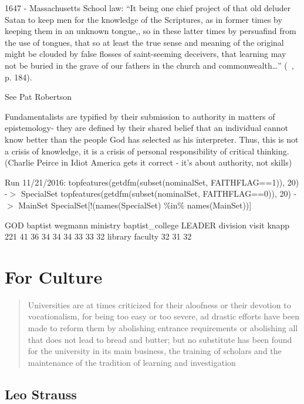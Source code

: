 1647 - Massachusetts School law:
``It being one chief project of that old deluder Satan to keep men for the knowledge of the Scriptures, as in former times by keeping them in an unknown tongue,, so in these latter times by persuafind from the use of tongues, that so at least the true sense and meaning of the original might be clouded by false flosses of saint-seeming deceivers, that learning may not be buried in the grave of our fathers in the church and commonwealth{\ldots}'' (~\citep{Adler:1976tx}, p. 184).

See Pat Robertson

Fundamentalists are typified by their submission to authority in matters of epistemology- they are defined by their shared belief that an individual cannot know better than the people God has selected as his interpreter. Thus, this is not a crisis of knowledge, it is a crisis of personal responsibility of critical thinking. (Charlie Peirce in Idiot America gets it correct - it's about authority, not skills)

Run 11\slash 21\slash 2016:
topfeatures(getdfm(subset(nominalSet, FAITHFLAG==1)), 20) -$>$ SpecialSet
topfeatures(getdfm(subset(nominalSet, FAITHFLAG==0)), 20) -$>$ MainSet
SpecialSet[!(names(SpecialSet) \%in\% names(MainSet))]

GOD baptist wegmann ministry baptist\_college LEADER division visit knapp
 221 41 36 34 34 34 33 33 32
 library faculty
 32 31
 32

\chapter{For Culture}
\label{forculture}

\begin{quote}

Universities are at times criticized for their aloofness or their devotion to vocationalism, for being too easy or too severe, ad drastic efforts have been made to reform them by abolishing entrance requirements or abolishing all that does not lead to bread and butter; but no substitute has been found for the university in its main business, the training of scholars and the maintenance of the tradition of learning and investigation ~\citep[p. 25]{Haskins:2013ua}
\end{quote}

\section{Leo Strauss}
\label{leostrauss}

